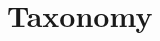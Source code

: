 \documentclass[12pt,a4paper,footinclude=true,twoside,headinclude=true]{report}
\begin{document}








\chapter{Taxonomy}\label{sec:problem1}

\end{document}
